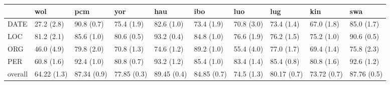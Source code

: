 \begin{tabular}{llllllllll}
\toprule
{} &          wol &          pcm &          yor &          hau &          ibo &         luo &          lug &          kin &          swa \\
\midrule
DATE    &   27.2 (2.8) &   90.8 (0.7) &   75.4 (1.9) &   82.6 (1.0) &   73.4 (1.9) &  70.8 (3.0) &   73.4 (1.4) &   67.0 (1.8) &   85.0 (1.7) \\
LOC     &   81.2 (2.1) &   85.6 (1.0) &   80.6 (0.5) &   93.2 (0.4) &   84.8 (1.0) &  76.6 (1.9) &   76.2 (1.5) &   75.2 (1.0) &   90.6 (0.5) \\
ORG     &   46.0 (4.9) &   79.8 (2.0) &   70.8 (1.3) &   74.6 (1.2) &   89.2 (1.0) &  55.4 (4.0) &   77.0 (1.7) &   69.4 (1.4) &   75.8 (2.3) \\
PER     &   60.8 (1.6) &   92.4 (1.0) &   80.8 (0.7) &   93.2 (1.2) &   85.4 (1.0) &  83.4 (1.4) &   85.4 (0.8) &   80.8 (1.6) &   92.6 (1.2) \\
overall &  64.22 (1.3) &  87.34 (0.9) &  77.85 (0.3) &  89.45 (0.4) &  84.85 (0.7) &  74.5 (1.3) &  80.17 (0.7) &  73.72 (0.7) &  87.76 (0.5) \\
\bottomrule
\end{tabular}
